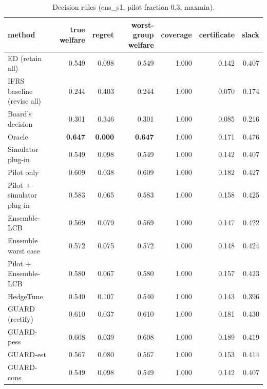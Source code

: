 \begin{table}[t]
\centering
\small
\begin{tabular}{lrrrrrr}
\toprule
method & true welfare & regret & worst-group welfare & coverage & certificate & slack \\
\midrule
ED (retain all) & 0.549 & 0.098 & 0.549 & 1.000 & 0.142 & 0.407 \\
IFRS baseline (revise all) & 0.244 & 0.403 & 0.244 & 1.000 & 0.070 & 0.174 \\
Board's decision & 0.301 & 0.346 & 0.301 & 1.000 & 0.085 & 0.216 \\
Oracle & \textbf{0.647} & \textbf{0.000} & \textbf{0.647} & 1.000 & 0.171 & 0.476 \\
Simulator plug-in & 0.549 & 0.098 & 0.549 & 1.000 & 0.142 & 0.407 \\
Pilot only & 0.609 & 0.038 & 0.609 & 1.000 & 0.182 & 0.427 \\
Pilot + simulator plug-in & 0.583 & 0.065 & 0.583 & 1.000 & 0.158 & 0.425 \\
Ensemble-LCB & 0.569 & 0.079 & 0.569 & 1.000 & 0.147 & 0.422 \\
Ensemble worst case & 0.572 & 0.075 & 0.572 & 1.000 & 0.148 & 0.424 \\
Pilot + Ensemble-LCB & 0.580 & 0.067 & 0.580 & 1.000 & 0.157 & 0.423 \\
HedgeTune & 0.540 & 0.107 & 0.540 & 1.000 & 0.143 & 0.396 \\
GUARD (rectify) & 0.610 & 0.037 & 0.610 & 1.000 & 0.181 & 0.430 \\
GUARD-pess & 0.608 & 0.039 & 0.608 & 1.000 & 0.189 & 0.419 \\
GUARD-est & 0.567 & 0.080 & 0.567 & 1.000 & 0.153 & 0.414 \\
GUARD-cons & 0.549 & 0.098 & 0.549 & 1.000 & 0.142 & 0.407 \\
\bottomrule
\end{tabular}
\caption{Decision rules (ens\_s1, pilot fraction 0.3, maxmin).}
\label{tab:methods-maxmin}
\end{table}
